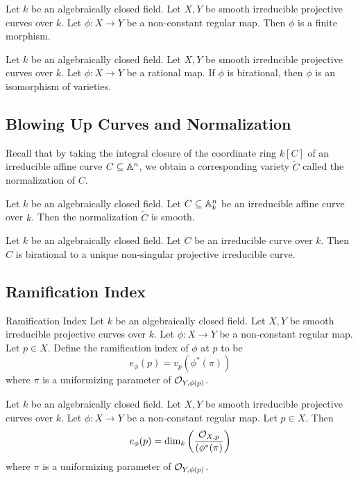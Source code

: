 \documentclass[a4paper]{article}
\begin{document}
\begin{prp}{}{} Let $k$ be an algebraically closed field. Let $X,Y$ be smooth irreducible projective curves over $k$. Let $\phi:X\to Y$ be a non-constant regular map. Then $\phi$ is a finite morphism. 
\end{prp}

\begin{prp}{}{} Let $k$ be an algebraically closed field. Let $X,Y$ be smooth irreducible projective curves over $k$. Let $\phi:X\to Y$ be a rational map. If $\phi$ is birational, then $\phi$ is an isomorphism of varieties. 
\end{prp}

\subsection{Blowing Up Curves and Normalization}
Recall that by taking the integral closure of the coordinate ring $k[C]$ of an irreducible affine curve $C\subseteq\mathbb{A}^n$, we obtain a corresponding variety $\widetilde{C}$ called the normalization of $C$. 

\begin{prp}{}{} Let $k$ be an algebraically closed field. Let $C\subseteq\mathbb{A}_k^n$ be an irreducible affine curve over $k$. Then the normalization $\widetilde{C}$ is smooth. 
\end{prp}

\begin{thm}{}{} Let $k$ be an algebraically closed field. Let $C$ be an irreducible curve over $k$. Then $C$ is birational to a unique non-singular projective irreducible curve. 
\end{thm}

\subsection{Ramification Index}
\begin{defn}{Ramification Index}{} Let $k$ be an algebraically closed field. Let $X,Y$ be smooth irreducible projective curves over $k$. Let $\phi:X\to Y$ be a non-constant regular map. Let $p\in X$. Define the ramification index of $\phi$ at $p$ to be $$e_\phi(p)=v_p(\phi^\ast(\pi))$$ where $\pi$ is a uniformizing parameter of $\mathcal{O}_{Y,\phi(p)}$. 
\end{defn}

\begin{lmm}{}{} Let $k$ be an algebraically closed field. Let $X,Y$ be smooth irreducible projective curves over $k$. Let $\phi:X\to Y$ be a non-constant regular map. Let $p\in X$. Then $$e_\phi(p)=\dim_k\left(\frac{\mathcal{O}_{X,p}}{(\phi^\ast(\pi)}\right)$$ where $\pi$ is a uniformizing parameter of $\mathcal{O}_{Y,\phi(p)}$. 
\end{lmm}
\end{document}
